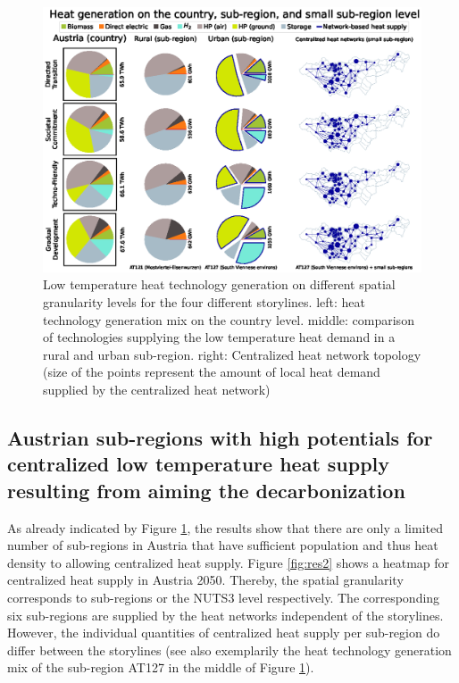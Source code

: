 \begin{figure}
	\centering
	\includegraphics[width=1\linewidth]{figures/4_Results/Spatial_results.eps}
	\caption{Low temperature heat technology generation on different spatial granularity levels for the four different storylines. left: heat technology generation mix on the country level. middle: comparison of technologies supplying the low temperature heat demand in a rural and urban sub-region. right: Centralized heat network topology (size of the points represent the amount of local heat demand supplied by the centralized heat network)}
	\label{fig:res1}
\end{figure}
\newpage
\subsection{Austrian sub-regions with high potentials for centralized low temperature heat supply resulting from aiming the decarbonization}\label{res:3}
As already indicated by Figure \ref{fig:res1}, the results show that there are only a limited number of sub-regions in Austria that have sufficient population and thus heat density to allowing centralized heat supply. Figure \ref{fig:res2} shows a heatmap for centralized heat supply in Austria 2050. Thereby, the spatial granularity corresponds to sub-regions or the NUTS3 level respectively. The corresponding six sub-regions are supplied by the heat networks independent of the storylines. However, the individual quantities of centralized heat supply per sub-region do differ between the storylines (see also exemplarily the heat technology generation mix of the sub-region AT127 in the middle of Figure \ref{fig:res1}). 


